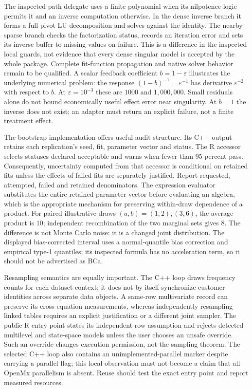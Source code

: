 The inspected path delegate uses a finite polynomial when its nilpotence logic
permits it and an inverse computation otherwise. In the dense inverse branch it
forms a full-pivot LU decomposition and solves against the identity. The nearby
sparse branch checks the factorization status, records an iteration error and
sets its inverse buffer to missing values on failure. This is a difference in
the inspected local guards, not evidence that every dense singular model is
accepted by the whole package. Complete fit-function propagation and native
solver behavior remain to be qualified. A scalar feedback coefficient
$b=1-\varepsilon$ illustrates the underlying numerical problem: the response
$(1-b)^{-1}=\varepsilon^{-1}$ has derivative $\varepsilon^{-2}$ with respect
to $b$. At $\varepsilon=10^{-3}$ these are $1000$ and $1{,}000{,}000$.
Small residuals alone do not bound economically useful effect error near
singularity. At $b=1$ the inverse does not exist; an adapter must return an
explicit failure, not a finite treatment effect.\citep{exec25_cmed_openmx,exec25_cmed_choice}

The bootstrap implementation offers useful audit structure. Its C++ output
retains each replication's seed, fit, parameter vector and status. The R accessor
selects statuses declared acceptable and warns when fewer than 95 percent pass.
Consequently, uncertainty computed from that accessor is conditional on retained
fits unless the effects of failed fits are separately justified. Report requested,
attempted, failed and retained denominators. The expression evaluator substitutes
the entire retained parameter vector before evaluating an algebra, which is the
appropriate mechanism for preserving within-draw dependence of a product.
For paired illustrative draws $(a,b)=(1,2),(3,6)$, the average product is $10$;
independent recombination of the two marginal sets gives $8$. The difference is
not Monte Carlo noise: it is a changed joint distribution. The displayed
bias-corrected interval uses a normal-quantile bias correction and empirical
type-1 quantiles; its inspected formula has no acceleration term, so it should
not be advertised as BCa.\citep{exec25_cmed_openmx,exec25_cmed_choice}

Resampling semantics are equally important. The C++ loop draws frequency counts
for each dataset context; it does not by itself synchronize customer identities
across separate data objects. A same-row multivariate record can preserve its
cross-equation measurements, whereas independently resampling linked tables
requires an explicit justification or a different joint sampler. The public R
entry point states its independent-row assumption and rejects detected multilevel
and state-space models unless the user chooses an unsafe override. Such an
override changes execution permission, not the sampling theorem. The selected
C++ loop also contains an unimplemented-parallel marker despite carrying a
parallel flag; this local observation must not become a claim that all OpenMx
parallelism is absent. Reuse should test the exact entry point and report measured
resources.\citep{exec25_cmed_openmx}

